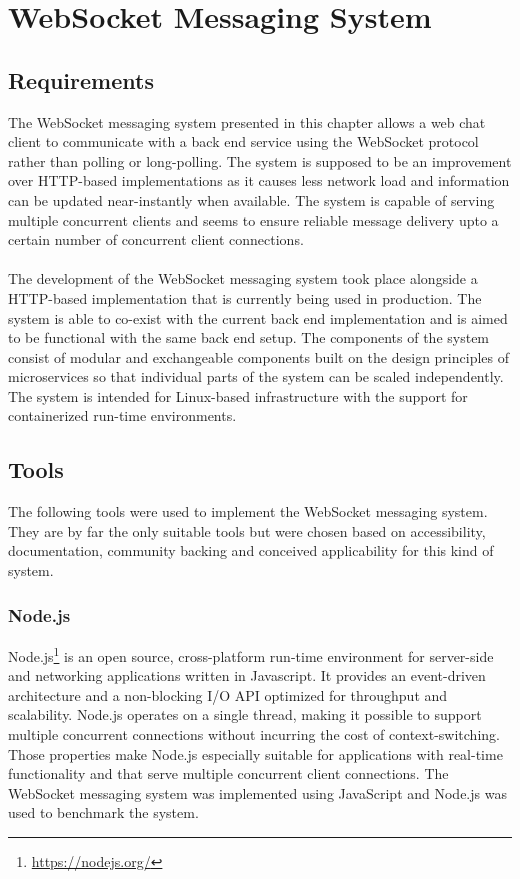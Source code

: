 \chapter{WebSocket Messaging System}
\label{chapter:websocketMessagingSystem}

\section{Requirements}

The WebSocket messaging system presented in this chapter allows a web chat client to communicate with a back end service using the WebSocket protocol rather than polling or long-polling. The system is supposed to be an improvement over HTTP-based implementations as it causes less network load and information can be updated near-instantly when available. The system is capable of serving multiple concurrent clients and seems to ensure reliable message delivery upto a certain number of concurrent client connections.
\\ \\
The development of the WebSocket messaging system took place alongside a HTTP-based implementation that is currently being used in production. The system is able to co-exist with the current back end implementation and is aimed to be functional with the same back end setup. The components of the system consist of modular and exchangeable components built on the design principles of microservices so that individual parts of the system can be scaled independently. The system is intended for Linux-based infrastructure with the support for containerized run-time environments.

\section{Tools}

The following tools were used to implement the WebSocket messaging system. They are by far the only suitable tools but were chosen based on accessibility, documentation, community backing and conceived applicability for this kind of system.

\subsection{Node.js}

Node.js\footnote{\url{https://nodejs.org/}} is an open source, cross-platform run-time environment for server-side and networking applications written in Javascript. It provides an event-driven architecture and a non-blocking I/O API optimized for throughput and scalability. Node.js operates on a single thread, making it possible to support multiple concurrent connections without incurring the cost of context-switching. Those properties make Node.js especially suitable for applications with real-time functionality and that serve multiple concurrent client connections. The WebSocket messaging system was implemented using JavaScript and Node.js was used to benchmark the system.

